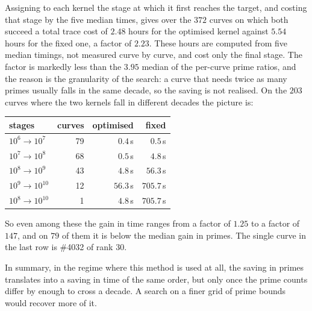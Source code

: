 \documentclass[11pt]{amsart}
\theoremstyle{remark}
\theoremstyle{definition}
\begin{document}
Assigning to each kernel the stage at which it first reaches the target, and costing that stage by
the five median times, gives over the $372$ curves on which both succeed a total trace cost of
$2.48$ hours for the optimised kernel against $5.54$ hours for the fixed one, a factor of $2.23$.
These hours are computed from five median timings, not measured curve by curve, and cost only the final stage. The factor is markedly
less than the $3.95$ median of the per-curve prime ratios, and the reason is the granularity of the
search: a curve that needs twice as many primes usually falls in the same decade, so the saving is
not realised. On the $203$ curves where the two kernels fall in different decades the picture is:

\begin{center}\small
\begin{tabular}{lrrr}
\toprule
stages & curves & optimised & fixed\\
\midrule
$10^6\to10^7$ & 79 & $0.4$\,s & $0.5$\,s\\
$10^7\to10^8$ & 68 & $0.5$\,s & $4.8$\,s\\
$10^8\to10^9$ & 43 & $4.8$\,s & $56.3$\,s\\
$10^9\to10^{10}$ & 12 & $56.3$\,s & $705.7$\,s\\
$10^8\to10^{10}$ & 1 & $4.8$\,s & $705.7$\,s\\
\bottomrule
\end{tabular}
\end{center}

\noindent
So even among these the gain in time ranges from a factor of $1.25$ to a factor of $147$, and on $79$ of
them it is below the median gain in primes. The single curve in the last row is \#4032 of rank $30$.

In summary, in the regime where this method is used at all, the saving in
primes translates into a saving in time of the same order, but only once the prime counts differ
by enough to cross a decade. A search on a finer grid of prime bounds would recover more of it.
\end{document}
